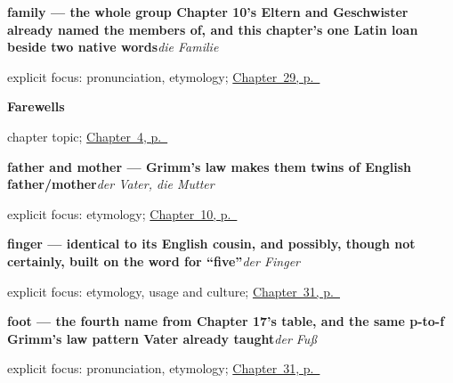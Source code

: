 \noindent\begin{minipage}[t]{\linewidth}
\raggedright
\textbf{family — the whole group Chapter 10's Eltern and Geschwister already named the members of, and this chapter's one Latin loan beside two native words}\enspace\emph{die Familie}\par
\footnotesize explicit focus: pronunciation, etymology; \hyperref[ch:ge-friend-and-family]{Chapter~29, p.~\pageref*{ch:ge-friend-and-family}}
\end{minipage}\par\smallskip

\noindent\begin{minipage}[t]{\linewidth}
\raggedright
\textbf{Farewells}\par
\footnotesize chapter topic; \hyperref[ch:farewells]{Chapter~4, p.~\pageref*{ch:farewells}}
\end{minipage}\par\smallskip

\noindent\begin{minipage}[t]{\linewidth}
\raggedright
\textbf{father and mother — Grimm's law makes them twins of English father/mother}\enspace\emph{der Vater, die Mutter}\par
\footnotesize explicit focus: etymology; \hyperref[ch:family]{Chapter~10, p.~\pageref*{ch:family}}
\end{minipage}\par\smallskip

\noindent\begin{minipage}[t]{\linewidth}
\raggedright
\textbf{finger — identical to its English cousin, and possibly, though not certainly, built on the word for \textquotedblleft{}five\textquotedblright{}}\enspace\emph{der Finger}\par
\footnotesize explicit focus: etymology, usage and culture; \hyperref[ch:ge-hand-table-complete]{Chapter~31, p.~\pageref*{ch:ge-hand-table-complete}}
\end{minipage}\par\smallskip

\noindent\begin{minipage}[t]{\linewidth}
\raggedright
\textbf{foot — the fourth name from Chapter 17's table, and the same p-to-f Grimm's law pattern Vater already taught}\enspace\emph{der Fuß}\par
\footnotesize explicit focus: pronunciation, etymology; \hyperref[ch:ge-hand-table-complete]{Chapter~31, p.~\pageref*{ch:ge-hand-table-complete}}
\end{minipage}\par\smallskip

